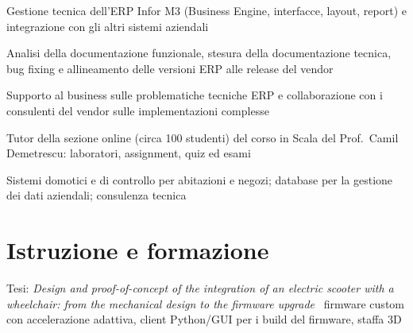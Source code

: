 \documentclass[a4paper,10pt]{article}
\begin{document}
\begin{cvitems}
  \item Gestione tecnica dell'ERP Infor M3 (Business Engine, interfacce, layout, report) e integrazione con gli altri sistemi aziendali
  \item Analisi della documentazione funzionale, stesura della documentazione tecnica, bug fixing e allineamento delle versioni ERP alle release del vendor
  \item Supporto al business sulle problematiche tecniche ERP e collaborazione con i consulenti del vendor sulle implementazioni complesse
\end{cvitems}

\begin{cvitems}
  \item Tutor della sezione online (circa 100 studenti) del corso in Scala del Prof.\ Camil Demetrescu: laboratori, assignment, quiz ed esami
\end{cvitems}


\begin{cvitems}
  \item Sistemi domotici e di controllo per abitazioni e negozi; database per la gestione dei dati aziendali; consulenza tecnica
\end{cvitems}

\section{Istruzione e formazione}

\begin{cvitems}
  \item Tesi: \textit{Design and proof-of-concept of the integration of an electric scooter with a wheelchair: from the mechanical design to the firmware upgrade} \textendash\ firmware custom con accelerazione adattiva, client Python/GUI per i build del firmware, staffa 3D
\end{cvitems}
\end{document}

